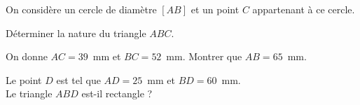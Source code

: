 On considère un cercle de diamètre $[AB]$ et un point $C$ appartenant à ce cercle.
\begin{myenumerate}
\item Déterminer la nature du triangle $ABC$.
\item On donne $AC = 39$~mm et $BC = 52$~mm. Montrer que $AB=65$~mm.
\item Le point $D$ est tel que $AD=25$~mm et $BD=60$~mm.\\
Le triangle $ABD$ est-il rectangle ?
\end{myenumerate}